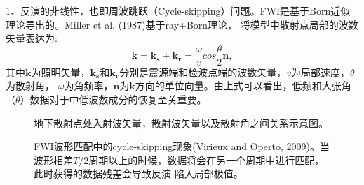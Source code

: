 1、反演的非线性，也即周波跳跃（Cycle-skipping）问题。FWI是基于Born近似理论导出的。Miller et
al. (1987)\cite{MillerEtAl1987}基于ray+Born理论，
将模型中散射点局部的波数矢量表达为:
\begin{equation}
    \mathbf{k}=\mathbf{k_s}+\mathbf{k_r}=\frac{\omega}{v}cos\frac{\theta}{2}\mathbf{n},
    \label{eq:Modelwnb}
\end{equation}
其中$\mathbf{k}$为照明矢量，$\mathbf{k_s}$和$\mathbf{k_r}$分别是震源端和检波点端的波数矢量，$v$为局部速度，$\theta$为散射角，
$\omega$为角频率，$\mathbf{n}$为$\mathbf{k}$方向的单位向量。由上式可以看出，低频和大张角（$\theta$）数据对于中低波数成分的恢复至关重要。
\begin{figure}[!htb] 
   \centering 
   \caption{地下散射点处入射波矢量，散射波矢量以及散射角之间关系示意图。}
   \label{fig:WavenumberVector}
\end{figure}
\begin{figure}[!htb] 
   \centering 
   \caption{FWI波形匹配中的cycle-skipping现象(Virieux and Operto,
	   2009\cite{virieux2009overview})。当波形相差$T/2$周期以上的时候，数据将会在另一个周期中进行匹配，此时获得的数据残差会导致反演
   陷入局部极值。}
   \label{fig:Cycleskipping}
\end{figure}
